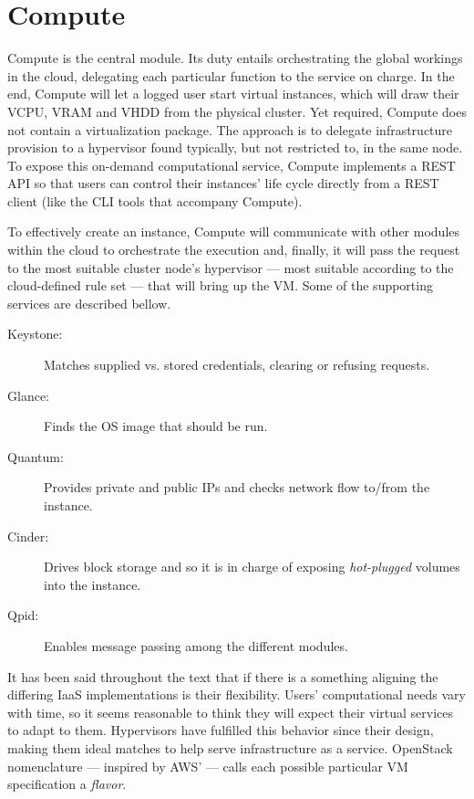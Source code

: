 \section{Compute}\label{sec:compute}

\noindent Compute is the central module. Its duty entails orchestrating the global workings in the cloud, delegating each particular function to the service on charge. In the end, Compute will let a logged user start virtual instances, which will draw their VCPU, VRAM and VHDD from the physical cluster. Yet required, Compute does not contain a virtualization package. The approach is to delegate infrastructure provision to a hypervisor found typically, but not restricted to, in the same node. To expose this on-demand computational service, Compute implements a REST API so that users can control their instances' life cycle directly from a REST client (like the CLI tools that accompany Compute).

To effectively create an instance, Compute will communicate with other modules within the cloud to orchestrate the execution and, finally, it will pass the request to the most suitable cluster node's hypervisor --- most suitable according to the cloud-defined rule set --- that will bring up the VM. Some of the supporting services are described bellow.

\begin{description}
 \item[Keystone:] Matches supplied vs. stored credentials, clearing or refusing requests.
 \item[Glance:] Finds the OS image that should be run.
 \item[Quantum:] Provides private and public IPs and checks network flow to/from the instance.
 \item[Cinder:] Drives block storage and so it is in charge of exposing \emph{hot-plugged} volumes into the instance.
 \item[Qpid:] Enables message passing among the different modules.
\end{description}

It has been said throughout the text that if there is a something aligning the differing IaaS implementations is their flexibility. Users' computational needs vary with time, so it seems reasonable to think they will expect their virtual services to adapt to them. Hypervisors have fulfilled this behavior since their design, making them ideal matches to help serve infrastructure as a service. OpenStack nomenclature --- inspired by AWS' --- calls each possible particular VM specification a \emph{flavor}.

